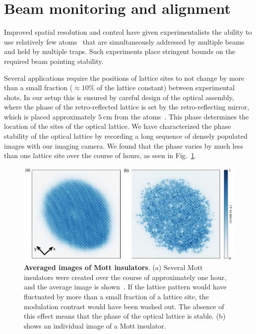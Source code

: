 \documentclass[twocolumn,aip,rsi,reprint,bibnotes]{revtex4-1}
\newcommand\unit[2]{\ensuremath{#1~\mathrm{{#2}}}}
\begin{document}
\section{Beam monitoring and alignment}
Improved spatial resolution and control have given experimentalists the ability to use relatively few atoms~\cite{Preiss2015, Choi2016, Mazurenko2017} that are simultaneously addressed by multiple beams and held by multiple traps.
Such experiments place stringent bounds on the required beam pointing stability.

Several applications require the positions of lattice sites to not change by more than a small fraction ($\approx 10\%$ of the lattice constant) between experimental shots.
In our setup this is ensured by careful design of the optical assembly, where the phase of the retro-reflected lattice is set by the retro-reflecting mirror, which is placed approximately \unit{5}{cm} from the atoms~\cite{Huber2014}.
This phase determines the location of the sites of the optical lattice.
We have characterized the phase stability of the optical lattice by recording a long sequence of densely populated images with our imaging camera. We found that the phase varies by much less than one lattice site over the course of hours, as seen in Fig.~\ref{fig:averaged_mott}.

\begin{figure}
  \begin{center}
    \includegraphics{Figure12.pdf}
    \caption{\textbf{Averaged images of Mott insulators}. (a) Several Mott insulators were created over the course of approximately one hour, and the average image is shown~\cite{Greif2016}. If the lattice pattern would have fluctuated by more than a small fraction of a lattice site, the modulation contrast would have been washed out. The absence of this effect means that the phase of the optical lattice is stable. (b) shows an individual image of a Mott insulator.}\label{fig:averaged_mott}
  \end{center}
\end{figure}
\end{document}
